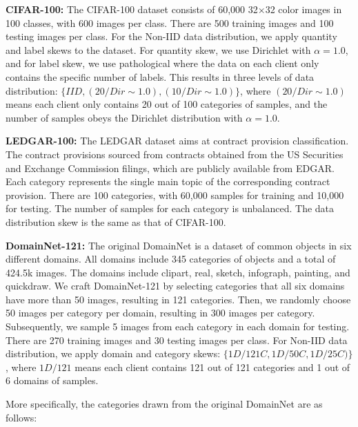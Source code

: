 \documentclass[sigconf]{acmart}
\newcommand*\circled[1]{\tikz[baseline=(char.base)]{
            \node[shape=circle,draw,inner sep=0.4pt] (char) {#1};}}
\begin{document}
\circled{3} \textbf{CIFAR-100:} The CIFAR-100 dataset consists of 60,000 32$\times$32 color images in 100 classes, with 600 images per class. There are 500 training images and 100 testing images per class. For the Non-IID data distribution, we apply quantity and label skews to the dataset. For quantity skew, we use Dirichlet with $\alpha=1.0$, and for label skew, we use pathological where the data on each client only contains the specific number of labels. This results in three levels of data distribution: $\{IID, (20/Dir\sim1.0), (10/Dir\sim1.0)\}$, where $(20/Dir\sim1.0)$ means each client only contains 20 out of 100 categories of samples, and the number of samples obeys the Dirichlet distribution with $\alpha=1.0$. 

\circled{4} \textbf{LEDGAR-100:} The LEDGAR dataset aims at contract provision classification. The contract provisions sourced from contracts obtained from the US Securities and Exchange Commission filings, which are publicly available from EDGAR. Each category represents the single main topic of the corresponding contract provision. There are 100 categories, with 60,000 samples for training and 10,000 for testing. The number of samples for each category is unbalanced. The data distribution skew is the same as that of CIFAR-100. 

\circled{5} \textbf{DomainNet-121:} The original DomainNet is a dataset of common objects in six different domains. All domains include 345 categories of objects and a total of {424.5k} images. The domains include clipart, real, sketch, infograph, painting, and quickdraw. We craft DomainNet-121 by selecting categories that all six domains have more than 50 images, resulting in 121 categories. Then, we randomly choose 50 images per category per domain, resulting in 300 images per category. Subsequently, we sample 5 images from each category in each domain for testing. There are 270 training images and 30 testing images per class. For Non-IID data distribution, we apply domain and category skews: $\{1D/121C, 1D/50C, 1D/25C)\}$, where $1D/121$ means each client contains 121 out of 121 categories and 1 out of 6 domains of samples.  

More specifically, the categories drawn from the original DomainNet are as follows:
\end{document}
